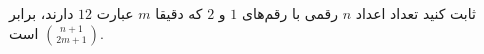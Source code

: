 \EXERCISE
ثابت کنید تعداد اعداد
$n$
رقمی با رقم‌های
$1$
و
$2$
که دقیقا
$m$
عبارت
$12$
دارند، برابر
$\binom{n+1}{2m+1}$
است.